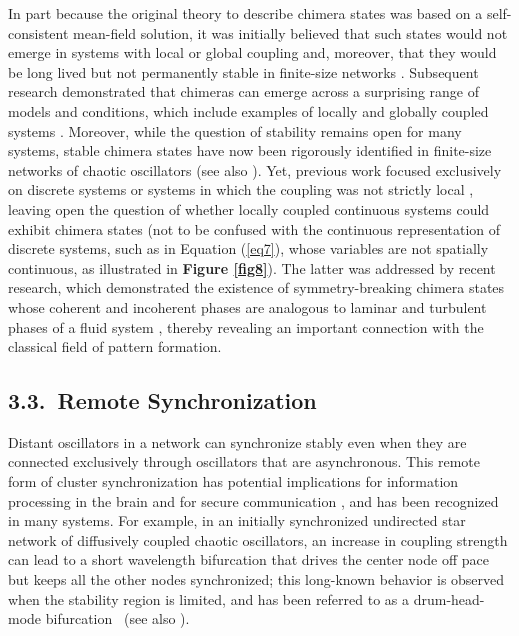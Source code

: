 \documentclass[
preprint,
superscriptaddress,
aps,
prl,
]{revtex4-1}
\begin{document}
In part because the original theory to describe chimera states was based on a self-consistent mean-field solution, it was initially believed that such states would not emerge in systems with local or global coupling \cite{abrams2004chimera} and, moreover, that they would be long lived but not permanently stable in finite-size networks \cite{wolfrum2011chimera}. 
{\color{black} Subsequent research demonstrated}
that chimeras can emerge across a surprising range of models and conditions, which include examples of locally and globally coupled systems \cite{panaggio2015chimera}. 
{\color{black} Moreover, while} 
the question of stability remains open for many systems, stable chimera states have 
now been rigorously
identified in finite-size networks of 
chaotic oscillators \cite{cho2017stable}  {\color{black} (see also \cite{suda2015persistent,hart2016experimental, bick2016chaotic}).} 
Yet, previous 
{\color{black} work}
focused exclusively on discrete systems or systems in which the coupling was not strictly local {\color{black} \cite{schmidt2014coexistence},} leaving open the question of whether locally coupled continuous systems could exhibit chimera states (not to be confused with the continuous representation of discrete systems, such as in Equation (\ref{eq7}), whose variables are not spatially continuous, as  illustrated in \textbf{Figure \ref{fig8}}). 
{\color{black} The latter was addressed by recent research, which demonstrated}
 the existence of symmetry-breaking chimera states whose coherent and incoherent phases are analogous to laminar and turbulent phases of a fluid system \cite{nicolaou2017continuous}, thereby revealing an important connection with the classical field of pattern formation. 




\subsection{3.3.~Remote Synchronization}

Distant oscillators in a network can synchronize stably even when they are connected exclusively 
through oscillators that are asynchronous. This remote form of cluster synchronization has potential implications for information processing in the brain \cite{nicosia2013remote} and for secure communication \cite{zhang2017incoherence}, and has been recognized in many systems.  For example, in an initially synchronized undirected star network of diffusively coupled chaotic oscillators, an increase in coupling strength can lead to a short wavelength bifurcation that drives the center node off pace but keeps all the other nodes synchronized; this long-known behavior is observed when the stability region is limited, and has been referred to as a drum-head-mode bifurcation~\cite{pecora1998master}  (see also \cite{winful1990synchronized}).
\end{document}
